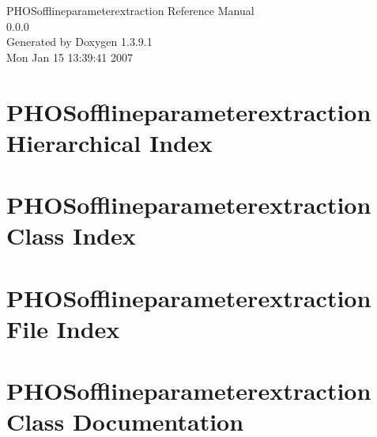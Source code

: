 \documentclass[a4paper]{book}
\begin{document}
\begin{titlepage}
\vspace*{7cm}
\begin{center}
{\Large PHOSofflineparameterextraction Reference Manual\\[1ex]\large 0.0.0 }\\
\vspace*{1cm}
{\large Generated by Doxygen 1.3.9.1}\\
\vspace*{0.5cm}
{\small Mon Jan 15 13:39:41 2007}\\
\end{center}
\end{titlepage}
\clearemptydoublepage
{}
\tableofcontents
\clearemptydoublepage
{}
\chapter{PHOSofflineparameterextraction Hierarchical Index}

\chapter{PHOSofflineparameterextraction Class Index}

\chapter{PHOSofflineparameterextraction File Index}

\chapter{PHOSofflineparameterextraction Class Documentation}











\end{document}
